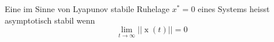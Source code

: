 Eine im Sinne von Lyapunov stabile Ruhelage $x^* = 0$ eines Systems heisst asymptotisch stabil wenn
$$\lim\limits_{t \to \infty}|| \operatorname{x}(t) || = 0$$
